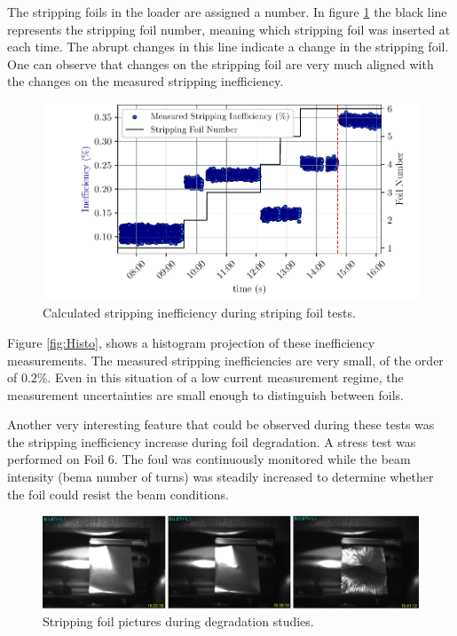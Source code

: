 The stripping foils in the loader are assigned a number. In figure \ref{fig:StrippingIneff} the black line represents the stripping foil number, meaning which stripping foil was inserted at each time. The abrupt changes in this line indicate a change in the stripping foil. One can observe that changes on the stripping foil are very much aligned with the changes on the measured stripping inefficiency. 

\begin{figure}[h]
    \centering
    \includegraphics[width=1.0\columnwidth]{StrippingEfficiency13April/April16.pdf}
    \caption{Calculated stripping inefficiency during striping foil tests.}
    \label{fig:StrippingIneff}
\end{figure}

Figure \ref{fig:Histo}, shows a histogram projection of these inefficiency measurements.  The measured stripping inefficiencies are very small, of the order of $0.2 \%$. Even in this situation of a low current measurement regime, the measurement uncertainties are small enough to distinguish between foils. 

Another very interesting feature that could be observed during these tests was the stripping inefficiency increase during foil degradation. A stress test was performed on Foil 6.  The foul was continuously monitored while the beam intensity (bema number of turns) was steadily increased to determine whether the foil could resist the beam conditions.

\begin{figure}[h]
    \centering
    \includegraphics[width=1.0\columnwidth]{Figure_SFPicture/SFDegradationPicture.png}
    \caption{Stripping foil pictures during degradation studies.}
    \label{fig:FoilPicture}
\end{figure}

